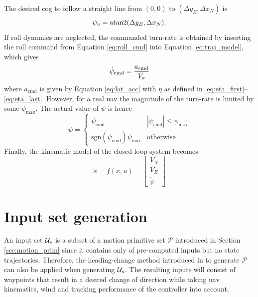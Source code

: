 The desired \ac{cog} to follow a straight line from $(0,0)$ to $(\Delta y_E, \Delta x_N)$ is
\begin{equation}
    \psi_u=\atan2(\Delta y_E,\Delta x_N).
\end{equation}
If roll dynamics are neglected, the commanded turn-rate is obtained by inserting the roll command from Equation \eqref{eq:roll_cmd} into Equation \eqref{eq:traj_model}, which gives 
\begin{equation}
    \dot{\psi}_{\text{cmd}}=\frac{a_{\text{cmd}}}{V_a}
\end{equation}
where $a_{\text{cmd}}$ is given by Equation \eqref{eq:lat_acc} with $\eta$ as defined in \eqref{eq:eta_first}--\eqref{eq:eta_last}.
However, for a real \ac{uav} the magnitude of the turn-rate is limited by some $\dot{\psi}_{\text{max}}$. The actual value of $\dot{\psi}$ is hence
\begin{equation}\label{eq:saturation}
    \dot{\psi}=\begin{cases}
        \dot{\psi}_{\text{cmd}} & |\dot{\psi}_{\text{cmd}}| \leq \dot{\psi}_{\text{max}} \\
        \text{sgn}(\dot{\psi}_{\text{cmd}})\dot{\psi}_{\text{max}} & \text{otherwise}
    \end{cases}
\end{equation}
Finally, the kinematic model of the closed-loop system becomes
\begin{equation}\label{eq:closed_loop}
    \dot{x}=f(x,u)=
    \begin{bmatrix}
        V_N\\
        V_E\\
        \dot{\psi}
    \end{bmatrix}
\end{equation}

\section{Input set generation}\label{sec:motion_prims_wind}
An input set $\mathcal{U}_s$ is a subset of a motion primitive set $\mathcal{P}$ introduced in Section \ref{sec:motion_prim} since it contains only of pre-computed inputs but no state trajectories. Therefore, 
the heading-change method introduced in \cite{Bergman_lic} to generate $\mathcal{P}$ can also be applied when generating $\mathcal{U}_s$. The resulting inputs will consist
of waypoints that result in a desired change of direction while taking \ac{uav} kinematics, wind and tracking performance of the controller into account.

